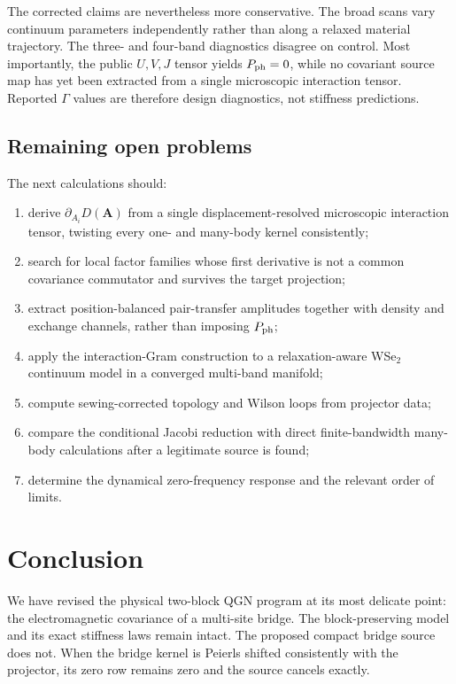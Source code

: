 \documentclass[11pt]{article}
\theoremstyle{remark}
\begin{document}
The corrected claims are nevertheless more conservative.  The broad scans vary continuum parameters independently rather than along a relaxed material trajectory.  The three- and four-band diagnostics disagree on control.  Most importantly, the public $U,V,J$ tensor yields $P_{\rm ph}=0$, while no covariant source map has yet been extracted from a single microscopic interaction tensor.  Reported $\Gamma$ values are therefore design diagnostics, not stiffness predictions.

\subsection{Remaining open problems}

The next calculations should:
\begin{enumerate}
\item derive $\partial_{A_i}D(\bm A)$ from a single displacement-resolved microscopic interaction tensor, twisting every one- and many-body kernel consistently;
\item search for local factor families whose first derivative is not a common covariance commutator and survives the target projection;
\item extract position-balanced pair-transfer amplitudes together with density and exchange channels, rather than imposing $P_{\rm ph}$;
\item apply the interaction-Gram construction to a relaxation-aware WSe$_2$ continuum model in a converged multi-band manifold;
\item compute sewing-corrected topology and Wilson loops from projector data;
\item compare the conditional Jacobi reduction with direct finite-bandwidth many-body calculations after a legitimate source is found;
\item determine the dynamical zero-frequency response and the relevant order of limits.
\end{enumerate}

\section{Conclusion}

We have revised the physical two-block QGN program at its most delicate point: the electromagnetic covariance of a multi-site bridge.  The block-preserving model and its exact stiffness laws remain intact.  The proposed compact bridge source does not.  When the bridge kernel is Peierls shifted consistently with the projector, its zero row remains zero and the source cancels exactly.
\end{document}
